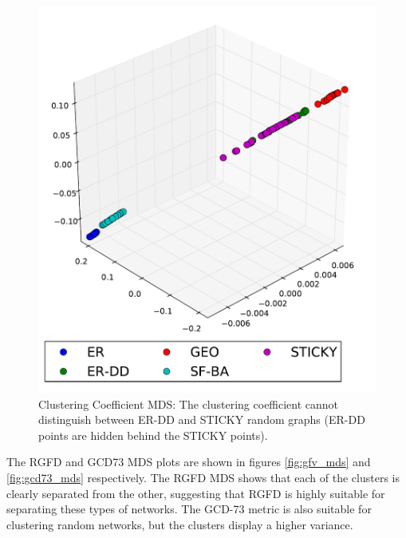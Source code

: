 \begin{figure}[H]
\begin{minipage}[b]{0.55\linewidth}
    \includegraphics[scale=0.45]
    {../code/final_results/trade_2010_thresholded/eval_results/clust_coeff_mds.pdf}
    \caption[Clustering Coefficient MDS]{Clustering Coefficient MDS: The clustering coefficient cannot distinguish between ER-DD and STICKY random graphs (ER-DD points are hidden behind the STICKY points).}
    \label{fig:clust_coeff_mds}
  \end{minipage} 
\label{fig:gcv_clust_mds} 
\end{figure}

The RGFD and GCD73 MDS plots are shown in figures \ref{fig:gfv_mds} and \ref{fig:gcd73_mds} respectively. The RGFD MDS shows that each of the clusters is clearly separated from the other, suggesting that RGFD is highly suitable for separating these types of networks. The GCD-73 metric is also suitable for clustering random networks, but the clusters display a higher variance.

